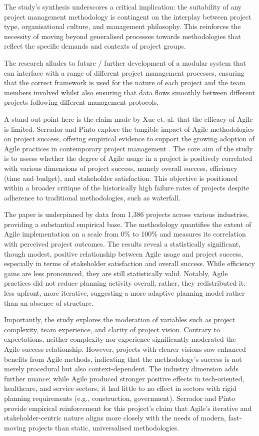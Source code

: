 \documentclass{report}
\begin{document}
The study's synthesis underscores a critical implication: the suitability of any project management methodology is contingent on the interplay between project type, organisational culture, and management philosophy. This reinforces the necessity of moving beyond generalised processes towards methodologies that reflect the specific demands and contexts of project groups.  

The research alludes to future / further development of a modular system that can interface with a range of different project management processes, ensuring that the correct framework is used for the nature of each project and the team members involved whilst also ensuring that data flows smoothly between different projects following different management protocols.

A stand out point here is the claim made by Xue et. al. that the efficacy of Agile is limited. Serrador and Pinto explore the tangible impact of Agile methodologies on project success, offering empirical evidence to support the growing adoption of Agile practices in contemporary project management \parencite{serradorDoesAgileWork2015}. The core aim of the study is to assess whether the degree of Agile usage in a project is positively correlated with various dimensions of project success, namely overall success, efficiency (time and budget), and stakeholder satisfaction. This objective is positioned within a broader critique of the historically high failure rates of projects despite adherence to traditional methodologies, such as waterfall.

The paper is underpinned by data from 1,386 projects across various industries, providing a substantial empirical base. The methodology quantifies the extent of Agile implementation on a scale from 0\% to 100\% and measures its correlation with perceived project outcomes. The results reveal a statistically significant, though modest, positive relationship between Agile usage and project success, especially in terms of stakeholder satisfaction and overall success. While efficiency gains are less pronounced, they are still statistically valid. Notably, Agile practices did not reduce planning activity overall, rather, they redistributed it: less upfront, more iterative, suggesting a more adaptive planning model rather than an absence of structure.

Importantly, the study explores the moderation of variables such as project complexity, team experience, and clarity of project vision. Contrary to expectations, neither complexity nor experience significantly moderated the Agile-success relationship. However, projects with clearer visions saw enhanced benefits from Agile methods, indicating that the methodology's success is not merely procedural but also context-dependent. The industry dimension adds further nuance: while Agile produced stronger positive effects in tech-oriented, healthcare, and service sectors, it had little to no effect in sectors with rigid planning requirements (e.g., construction, government). Serrador and Pinto provide empirical reinforcement for this project's claim that Agile's iterative and stakeholder-centric nature aligns more closely with the needs of modern, fast-moving projects than static, universalised methodologies.
\end{document}
